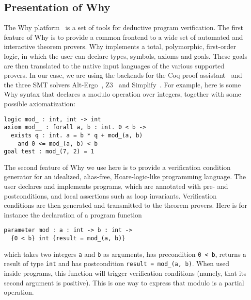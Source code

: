 \documentclass[runningheads,a4paper]{llncs}
\newcommand{\beforesub}{\vspace{-0.2cm}}
\newcommand{\aftersub}{\vspace{-0.1cm}}
\begin{document}
\beforesub
\subsection{Presentation of Why}
\label{subsec:why}
\aftersub

The Why platform~\cite{why} is a set of tools for deductive program
verification. The first feature of Why is to provide a common
frontend to a wide set of automated and interactive theorem provers.
Why implements a total, polymorphic, first-order logic, in which the user can
declare types, symbols, axioms and goals. These goals are then
translated to the native input languages of the various supported
provers. In our case, we are using the backends for the Coq proof
assistant~\cite{coq} and the three SMT solvers Alt-Ergo~\cite{alt-ergo},
Z3~\cite{Z3} and Simplify~\cite{Simplify}.
%
For example, here is some Why syntax that declares a
modulo operation over integers, together with some possible axiomatization:
\begin{lstlisting}
logic mod_ : int, int -> int
axiom mod__ : forall a, b : int. 0 < b ->
  exists q : int. a = b * q + mod_(a, b)
    and 0 <= mod_(a, b) < b
goal test : mod_(7, 2) = 1
\end{lstlisting}
The second feature of Why we use here is to provide a
verification condition generator for an idealized, alias-free,
Hoare-logic-like programming language. The user declares and
implements programs, which are annotated with pre- and postconditions,
and local assertions such as loop invariants. Verification conditions
are then generated and transmitted to the theorem provers.
Here is for instance the declaration of a program function
\begin{lstlisting}
parameter mod : a : int -> b : int ->
  {0 < b} int {result = mod_(a, b)}
\end{lstlisting}
which takes two integers \texttt{a} and \texttt{b} as arguments, has
precondition \texttt{0 < b}, returns a result of type \texttt{int} and
has postcondition \verb|result = mod_(a, b)|. When used inside programs,
this function will trigger verification conditions (namely, that
its second argument is positive). This is one way to express that
modulo is a partial operation.

\end{document}
